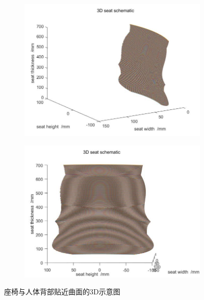 \begin{figure}[H]
\begin{subfigure}[b]{0.4\textwidth}
                        \includegraphics[width=\textwidth]{images/seat_body_back_near_curve3.jpg}
                    \end{subfigure}
                    \begin{subfigure}[b]{0.4\textwidth}
                        \includegraphics[width=\textwidth]{images/seat_body_back_near_curve4.jpg}
                    \end{subfigure}
                    \caption{座椅与人体背部贴近曲面的3D示意图}
                    \label{座椅与人体背部贴近曲面的3D示意图}
                \end{figure}

